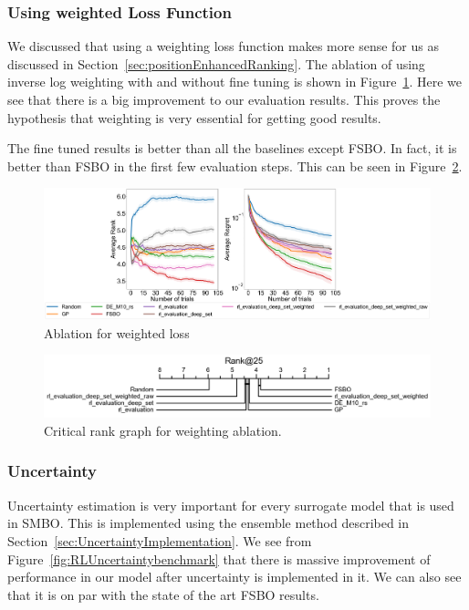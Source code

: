 \documentclass[12pt, twoside, ngerman]{report}
\begin{document}
\subsubsection{Using weighted Loss Function}
We discussed that using a weighting loss function makes more sense for us as discussed in Section~\ref{sec:positionEnhancedRanking}.
The ablation of using inverse log weighting with and without fine tuning is shown in Figure~\ref{fig:RLDeepSetWeighted}.
Here we see that there is a big improvement to our evaluation results.
This proves the hypothesis that weighting is very essential for getting good results.

The fine tuned results is better than all the baselines except FSBO.
In fact,  it is better than FSBO in the first few evaluation steps.
This can be seen in Figure~\ref{fig:RLDeepSetWeightedRank25}.

\begin{figure}[h]
  \centering
    \includegraphics[scale=0.20]{images/RLDeepSetWeighted}
    \caption{Ablation for weighted loss}
    \label{fig:RLDeepSetWeighted}
\end{figure}

\begin{figure}[h]
  \centering
    \includegraphics[scale=0.35]{images/RLDeepSetWeightedRank25}
    \caption{Critical rank graph for weighting ablation.}
    \label{fig:RLDeepSetWeightedRank25}
\end{figure}


\subsubsection{Uncertainty}
Uncertainty estimation is very important for every surrogate model that is used in SMBO.
This is implemented using the ensemble method described in Section~\ref{sec:UncertaintyImplementation}.
We see from Figure~\ref{fig:RLUncertaintybenchmark} that there is massive improvement of performance in our model after uncertainty is implemented in it.
We can also see that it is on par with the state of the art FSBO results.
\end{document}
